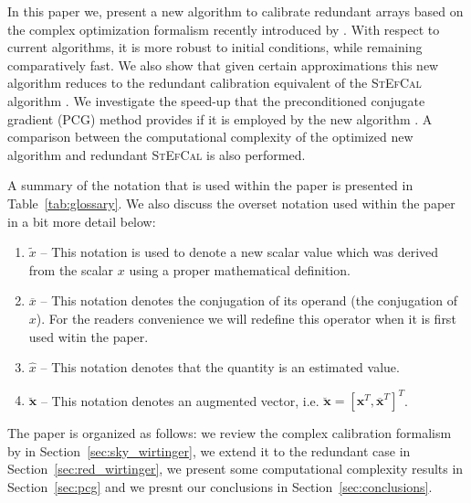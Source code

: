 \documentclass[useAMS,usenatbib]{mn2e}
\newcommand{\conj}[1]{\overline{#1}}
\begin{document}
In this paper we, present a new algorithm to calibrate redundant arrays based on the complex optimization formalism recently introduced by \cite{Smirnov2015}. 
With respect to current algorithms, it is more robust to initial conditions, while remaining comparatively fast. We also show that given certain approximations this new algorithm reduces to the redundant calibration equivalent of the \textsc{StEfCal} algorithm \citep{Salvini2014}.
We investigate the speed-up that the preconditioned conjugate gradient (PCG) method provides if it is employed by the new algorithm \citep{Liu2010}.
A comparison between the computational complexity of the optimized new algorithm and redundant \textsc{StEfCal} is also performed.

A summary of the notation that is used within the paper is presented in 
Table~\ref{tab:glossary}. We also discuss the overset notation used within the paper in a bit more detail below:
\begin{enumerate}
 \item $\widetilde{x}$ -- This notation is used to denote a new scalar value which was derived from the scalar $x$ using a proper mathematical definition.  
 \item $\conj{x}$ -- This notation denotes the conjugation of its operand (the conjugation of $x$). For the readers convenience we will redefine this operator when it is
 first used witin the paper.
 \item $\widehat{x}$ -- This notation denotes that the quantity is an estimated value.
 \item $\breve{\mathbf{x}}$ -- This notation denotes an augmented vector, i.e. $\breve{\mathbf{x}} = [\mathbf{x}^T,\conj{\mathbf{x}}^T]^T$. 
\end{enumerate}

The paper is organized as follows: we review the complex calibration formalism by \citet{Smirnov2015} in Section~\ref{sec:sky_wirtinger}, we extend it to the redundant case in Section~\ref{sec:red_wirtinger}, we present some computational complexity results in Section~\ref{sec:pcg} and we presnt our conclusions in Section~\ref{sec:conclusions}.

\end{document}
